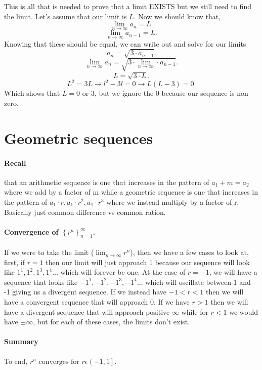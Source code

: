 \documentclass[a4paper]{article}
\begin{document}
This is all that is needed to prove that a limit EXISTS but we still need to find the limit. Let's assume that our limit is $ L $. Now we should know that,
\[
\lim_{ n \to \infty} a_n = L
.\] 
\[
\lim_{ n \to \infty} a_{ n-1 }= L 
.\] 
\newpage
Knowing that these should be equal, we can write out and solve for our limits
\[
a_n = \sqrt{ 3\cdot a_{ n-1 }}
.\] 
\[
\lim_{ n \to \infty} a_n = \sqrt{ 3\cdot \lim_{ n \to \infty} \cdot a_{ n-1 }}
.\] 
\[
L = \sqrt{ 3\cdot L}
.\] 
\[
L^2=3L \to l^2-3l = 0 \to L(L-3) = 0
.\] 
Which shows that $ L = 0 \text{ or }3 $, but we ignore the 0 because our sequence is non-zero. 

\section{Geometric sequences}%
\label{sec:Geometric sequences}
\paragraph{Recall}
that an arithmetic sequence is one that increases in the pattern of $ a_1 + m = a_2 $ where we add by a factor of m while a geometric sequence is one that increases in the pattern of $ a_1 \cdot r, a_1 \cdot r^2, a_1 \cdot r^{ 3 }$ where we instead multiply by a factor of r. Basically just common difference vs common ration. 

\paragraph{Convergence of $ \left\{ r^{ n } \right\}_{ n=1 }^{ \infty }  $.}
If we were to take the limit ($ \lim_{ n \to \infty} r^{ n }$), then we have a few cases to look at, first, if $ r=1 $ then our limit will just approach 1 because our sequence will look like $ 1^{ 1 }, 1^{ 2 },1^{ 3 },1^{ 4 }\ldots $ which will forever be one. At the case of $ r=-1 $, we will have a sequence that looks like $ -1^{ 1 }, -1^{ 2 }, -1^{ 3 }, -1^{ 4 }\ldots $ which will oscillate between 1 and -1 giving us a divergent sequence. If we instead have $ -1<r<1 $ then we will have a convergent sequence that will approach 0. If we have $ r>1 $ then we will have a divergent sequence that will approach positive $ \infty $ while for $ r<1 $ we would have $ \pm \infty $, but for each of these cases, the limits don't exist. 

\paragraph{Summary}
To end, $ r^{ n } \text{ converges for } r\epsilon\left( -1,1 \right] $.
\end{document}
